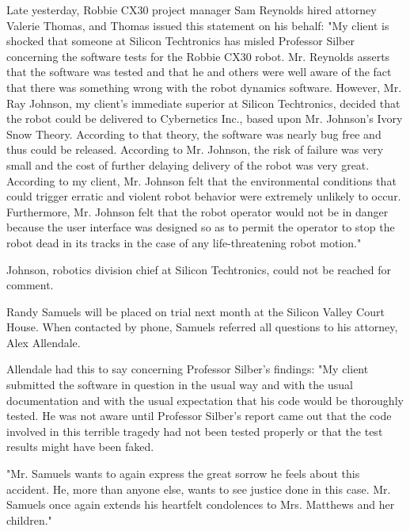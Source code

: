 Late yesterday, Robbie CX30 project manager Sam Reynolds hired attorney Valerie Thomas, and Thomas issued this statement on his behalf: "My client is shocked that someone at Silicon Techtronics has misled Professor Silber concerning the software tests for the Robbie CX30 robot. Mr. Reynolds asserts that the software was tested and that he and others were well aware of the fact that there was something wrong with the robot dynamics software. However, Mr. Ray Johnson, my client's immediate superior at Silicon Techtronics, decided that the robot could be delivered to Cybernetics Inc., based upon Mr. Johnson's Ivory Snow Theory. According to that theory, the software was nearly bug free and thus could be released. According to Mr. Johnson, the risk of failure was very small and the cost of further delaying delivery of the robot was very great. According to my client, Mr. Johnson felt that the environmental conditions that could trigger erratic and violent robot behavior were extremely unlikely to occur. Furthermore, Mr. Johnson felt that the robot operator would not be in danger because the user interface was designed so as to permit the operator to stop the robot dead in its tracks in the case of any life-threatening robot motion."

Johnson, robotics division chief at Silicon Techtronics, could not be reached for comment.

Randy Samuels will be placed on trial next month at the Silicon Valley Court House. When contacted by phone, Samuels referred all questions to his attorney, Alex Allendale.

Allendale had this to say concerning Professor Silber's findings: "My client submitted the software in question in the usual way and with the usual documentation and with the usual expectation that his code would be thoroughly tested. He was not aware until Professor Silber's report came out that the code involved in this terrible tragedy had not been tested properly or that the test results might have been faked.

"Mr. Samuels wants to again express the great sorrow he feels about this accident. He, more than anyone else, wants to see justice done in this case. Mr. Samuels once again extends his heartfelt condolences to Mrs. Matthews and her children."
